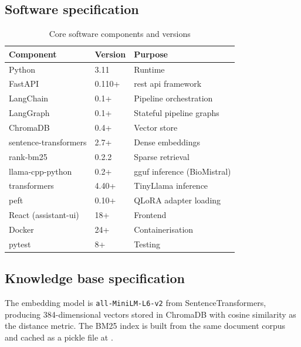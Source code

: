\subsection{Software specification}

\begin{table}[htbp]
\centering
\caption{Core software components and versions}
\renewcommand{\arraystretch}{1.3}
\begin{tabular}{|l|l|l|}
\hline
\textbf{Component} & \textbf{Version} & \textbf{Purpose} \\
\hline
Python & 3.11 & Runtime \\
FastAPI & 0.110+ & \ac{rest} \ac{api} framework \\
LangChain & 0.1+ & Pipeline orchestration \\
LangGraph & 0.1+ & Stateful pipeline graphs \\
ChromaDB & 0.4+ & Vector store \\
sentence-transformers & 2.7+ & Dense embeddings \\
rank-bm25 & 0.2.2 & Sparse retrieval \\
llama-cpp-python & 0.2+ & \ac{gguf} inference (BioMistral) \\
transformers & 4.40+ & TinyLlama inference \\
peft & 0.10+ & QLoRA adapter loading \\
React (assistant-ui) & 18+ & Frontend \\
Docker & 24+ & Containerisation \\
pytest & 8+ & Testing \\
\hline
\end{tabular}
\end{table}

\subsection{Knowledge base specification}

\begin{table}[htbp]
\centering
\caption{Knowledge base v2 composition}
\renewcommand{\arraystretch}{1.3}
\end{table}

The embedding model is \texttt{all-MiniLM-L6-v2} from SentenceTransformers, producing 384-dimensional vectors stored in ChromaDB with cosine similarity as the distance metric. The BM25 index is built from the same document corpus and cached as a pickle file at .
